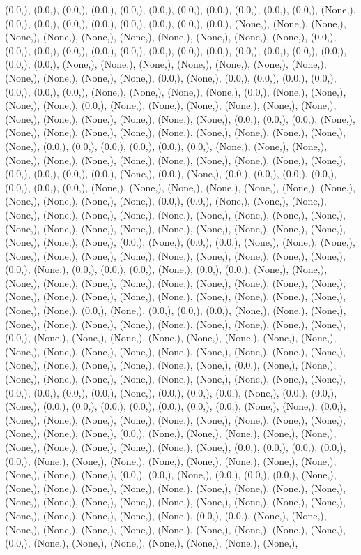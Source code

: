 \documentclass{article}
\begin{document}
(0.0,), (0.0,), (0.0,), (0.0,), (0.0,), (0.0,), (0.0,), (0.0,), (0.0,), (0.0,), (0.0,), (None,), (0.0,), (0.0,), (0.0,), (0.0,), (0.0,), (0.0,), (0.0,), (0.0,), (None,), (None,), (None,), (None,), (None,), (None,), (None,), (None,), (None,), (None,), (None,), (0.0,), (0.0,), (0.0,), (0.0,), (0.0,), (0.0,), (0.0,), (0.0,), (0.0,), (0.0,), (0.0,), (0.0,), (0.0,), (0.0,), (0.0,), (None,), (None,), (None,), (None,), (None,), (None,), (None,), (None,), (None,), (None,), (None,), (0.0,), (None,), (0.0,), (0.0,), (0.0,), (0.0,), (0.0,), (0.0,), (0.0,), (None,), (None,), (None,), (None,), (0.0,), (None,), (None,), (None,), (None,), (0.0,), (None,), (None,), (None,), (None,), (None,), (None,), (None,), (None,), (None,), (None,), (None,), (None,), (0.0,), (0.0,), (0.0,), (None,), (None,), (None,), (None,), (None,), (None,), (None,), (None,), (None,), (None,), (None,), (0.0,), (0.0,), (0.0,), (0.0,), (0.0,), (0.0,), (None,), (None,), (None,), (None,), (None,), (None,), (None,), (None,), (None,), (None,), (None,), (None,), (0.0,), (0.0,), (0.0,), (0.0,), (None,), (0.0,), (None,), (0.0,), (0.0,), (0.0,), (0.0,), (0.0,), (0.0,), (0.0,), (None,), (None,), (None,), (None,), (None,), (None,), (None,), (None,), (None,), (None,), (None,), (0.0,), (0.0,), (None,), (None,), (None,), (None,), (None,), (None,), (None,), (None,), (None,), (None,), (None,), (None,), (None,), (None,), (None,), (None,), (None,), (None,), (None,), (None,), (None,), (None,), (None,), (None,), (0.0,), (None,), (0.0,), (0.0,), (None,), (None,), (None,), (None,), (None,), (None,), (None,), (None,), (None,), (None,), (None,), (None,), (0.0,), (None,), (0.0,), (0.0,), (0.0,), (None,), (0.0,), (0.0,), (None,), (None,), (None,), (None,), (None,), (None,), (None,), (None,), (None,), (None,), (None,), (None,), (None,), (None,), (None,), (None,), (None,), (None,), (None,), (None,), (None,), (None,), (0.0,), (None,), (0.0,), (0.0,), (0.0,), (None,), (None,), (None,), (None,), (None,), (None,), (None,), (None,), (None,), (None,), (None,), (None,), (0.0,), (None,), (None,), (None,), (None,), (None,), (None,), (None,), (None,), (None,), (None,), (None,), (None,), (None,), (None,), (None,), (None,), (None,), (None,), (None,), (None,), (None,), (None,), (None,), (0.0,), (None,), (None,), (None,), (None,), (None,), (None,), (None,), (None,), (None,), (None,), (None,), (0.0,), (0.0,), (0.0,), (0.0,), (None,), (0.0,), (0.0,), (0.0,), (None,), (0.0,), (0.0,), (None,), (0.0,), (0.0,), (0.0,), (0.0,), (0.0,), (0.0,), (0.0,), (None,), (None,), (0.0,), (None,), (None,), (None,), (None,), (None,), (None,), (None,), (None,), (None,), (None,), (None,), (None,), (0.0,), (None,), (None,), (None,), (None,), (None,), (None,), (None,), (None,), (None,), (None,), (None,), (0.0,), (0.0,), (0.0,), (0.0,), (0.0,), (None,), (None,), (None,), (None,), (None,), (None,), (None,), (None,), (None,), (None,), (None,), (0.0,), (0.0,), (None,), (0.0,), (0.0,), (0.0,), (None,), (None,), (None,), (None,), (None,), (None,), (None,), (None,), (None,), (None,), (None,), (None,), (None,), (None,), (None,), (None,), (None,), (None,), (None,), (None,), (None,), (None,), (None,), (None,), (0.0,), (0.0,), (None,), (None,), (None,), (None,), (None,), (None,), (None,), (None,), (None,), (None,), (None,), (0.0,), (None,), (None,), (None,), (None,), (None,), (None,), (None,), 
\end{document}
